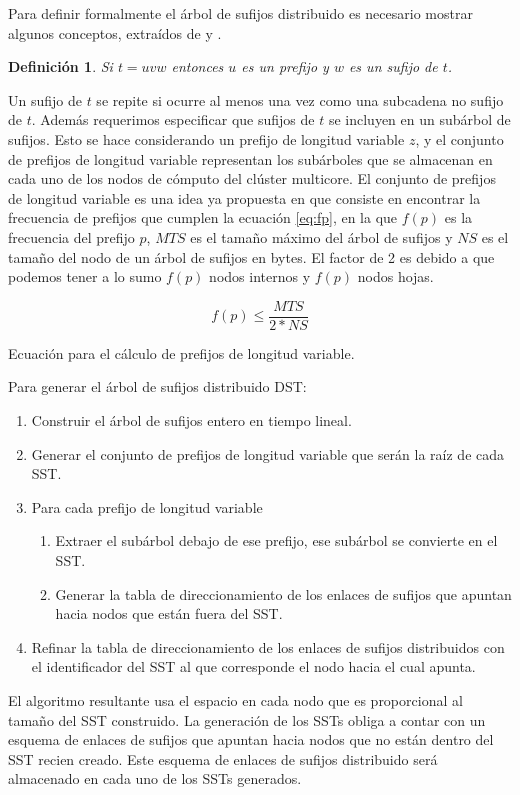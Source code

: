 \documentclass[12pt,a4paper]{article}
\newtheorem{mydef}{Definición}
\begin{document}
\indent
Para definir formalmente el árbol de sufijos distribuido es necesario mostrar
algunos conceptos, extraídos de \cite{Clifford2005} y \cite{Ghoting2010}. 
\begin{mydef}
  Si $t=uvw$ entonces $u$ es un \textit{prefijo} y $w$ es un \textit{sufijo}
de $t$.
\end{mydef}
\indent
Un sufijo de $t$ se repite si ocurre al menos una vez como una subcadena no sufijo de $t$.
Además requerimos especificar que sufijos de $t$ se incluyen en un subárbol de sufijos. Esto
se hace considerando un prefijo de longitud variable $z$, y el conjunto de prefijos de longitud variable representan 
los subárboles que se almacenan en cada uno de los nodos de cómputo del clúster multicore. El conjunto de prefijos de longitud variable es una idea ya propuesta en \cite{Ghoting2010} que consiste en encontrar la frecuencia de prefijos que cumplen la ecuación \ref{eq:fp}, en la que $f(p)$ es la frecuencia del prefijo $p$, $MTS$ es el tamaño máximo del árbol de sufijos y $NS$ es el tamaño del nodo de un árbol de sufijos en bytes. El factor de 2 es debido a que podemos tener a lo sumo $f(p)$ nodos internos y $f(p)$ nodos hojas.
\begin{center}
\begin{myeq}[!ht]
\begin{equation}
f(p)\le \frac{MTS}{2*NS}
\end{equation}
\caption{Ecuación para el cálculo de prefijos de longitud variable.}
\end{myeq}
\label{eq:fp}
\end{center}
Para generar el árbol de sufijos distribuido DST:
\begin{enumerate}
\item Construir el árbol de sufijos entero en tiempo lineal.
\item Generar el conjunto de prefijos de longitud variable que serán la raíz de cada SST.
\item Para cada prefijo de longitud variable
\begin{enumerate}
\item Extraer el subárbol debajo de ese prefijo, ese subárbol se convierte en el SST.
\item Generar la tabla de direccionamiento de los enlaces de sufijos que apuntan hacia nodos que están fuera del SST. 
\end{enumerate}
\item Refinar la tabla de direccionamiento de los enlaces de sufijos distribuidos con el identificador del SST al que corresponde el nodo hacia el cual apunta.
\end{enumerate}
\indent
El algoritmo resultante usa el espacio en cada nodo que es proporcional al tamaño del SST construido. La generación de los SSTs obliga a contar con un esquema de enlaces de sufijos que apuntan hacia nodos que no están dentro del SST recien creado. Este esquema de enlaces de sufijos distribuido será almacenado en cada uno de los SSTs generados.
\end{document}

